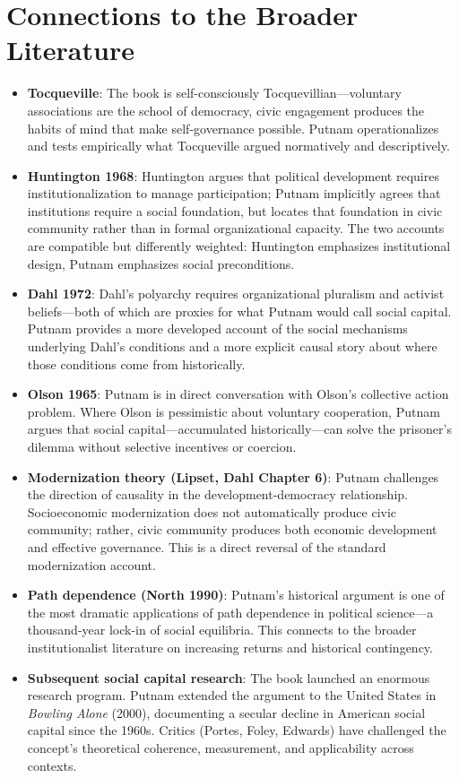 \documentclass[12pt]{article}
\begin{document}
\section{Connections to the Broader Literature}

\begin{itemize}[leftmargin=*, itemsep=4pt]
    \item \textbf{Tocqueville}: The book is self-consciously Tocquevillian---voluntary associations are the school of democracy, civic engagement produces the habits of mind that make self-governance possible. Putnam operationalizes and tests empirically what Tocqueville argued normatively and descriptively.
    \item \textbf{Huntington 1968}: Huntington argues that political development requires institutionalization to manage participation; Putnam implicitly agrees that institutions require a social foundation, but locates that foundation in civic community rather than in formal organizational capacity. The two accounts are compatible but differently weighted: Huntington emphasizes institutional design, Putnam emphasizes social preconditions.
    \item \textbf{Dahl 1972}: Dahl's polyarchy requires organizational pluralism and activist beliefs---both of which are proxies for what Putnam would call social capital. Putnam provides a more developed account of the social mechanisms underlying Dahl's conditions and a more explicit causal story about where those conditions come from historically.
    \item \textbf{Olson 1965}: Putnam is in direct conversation with Olson's collective action problem. Where Olson is pessimistic about voluntary cooperation, Putnam argues that social capital---accumulated historically---can solve the prisoner's dilemma without selective incentives or coercion.
    \item \textbf{Modernization theory (Lipset, Dahl Chapter 6)}: Putnam challenges the direction of causality in the development-democracy relationship. Socioeconomic modernization does not automatically produce civic community; rather, civic community produces both economic development and effective governance. This is a direct reversal of the standard modernization account.
    \item \textbf{Path dependence (North 1990)}: Putnam's historical argument is one of the most dramatic applications of path dependence in political science---a thousand-year lock-in of social equilibria. This connects to the broader institutionalist literature on increasing returns and historical contingency.
    \item \textbf{Subsequent social capital research}: The book launched an enormous research program. Putnam extended the argument to the United States in \textit{Bowling Alone} (2000), documenting a secular decline in American social capital since the 1960s. Critics (Portes, Foley, Edwards) have challenged the concept's theoretical coherence, measurement, and applicability across contexts.
\end{itemize}
\end{document}
